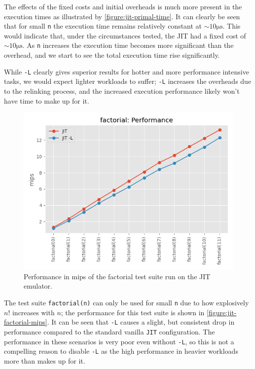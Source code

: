 The effects of the fixed costs and initial overheads is much more present in the execution times as illustrated by \autoref{figure:jit-primal-time}. It can clearly be seen that for small \texttt{n} the execution time remains relatively constant at $\sim 10\si{\micro\second}$. This would indicate that, under the circumstances tested, the JIT had a fixed cost of $\sim 10\si{\micro\second}$. As \texttt{n} increases the execution time becomes more significant than the overhead, and we start to see the total execution time rise significantly.

While \texttt{-L} clearly gives superior results for hotter and more performance intensive tasks, we would expect lighter workloads to suffer; \texttt{-L} increases the overheads due to the relinking process, and the increased execution performance likely won't have time to make up for it.

\begin{figure}[H]
    \centering
    \includegraphics[scale=0.75]{output/graphs/tests/jit/factorial/mips.png}
    \caption{Performance in mips of the factorial test suite run on the JIT emulator.}
    \label{figure:jit-factorial-mips}
\end{figure}

The test suite \texttt{factorial(n)} can only be used for small \texttt{n} due to how explosively $n!$ increases with $n$; the performance for this test suite is shown in \autoref{figure:jit-factorial-mips}. It can be seen that \texttt{-L} causes a slight, but consistent drop in performance compared to the standard vanilla \texttt{JIT} configuration. The performance in these scenarios is very poor even without \texttt{-L}, so this is not a compelling reason to disable \texttt{-L} as the high performance in heavier workloads more than makes up for it.

